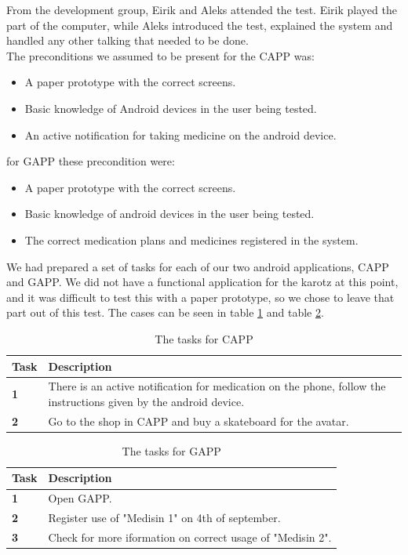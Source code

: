 From the development group, Eirik and Aleks attended the test. Eirik played the part of the computer, while Aleks introduced the test, explained the system and handled
any other talking that needed to be done.\\
The preconditions we assumed to be present for the CAPP was:
\begin{itemize}
	\item A paper prototype with the correct screens.
	\item Basic knowledge of Android devices in the user being tested.
	\item An active notification for taking medicine on the android device.
\end{itemize}
for GAPP these precondition were:
\begin{itemize}
	\item A paper prototype with the correct screens.
	\item Basic knowledge of android devices in the user being tested.
	\item The correct medication plans and medicines registered in the system.
\end{itemize}

We had prepared a set of tasks for each of our two android applications, CAPP and GAPP. We did not have a functional application for the karotz at this point, and it was difficult to
test this with a paper prototype, so we chose to leave that part out of this test. The cases can be seen in table \ref{tab:capptasks} and table \ref{tab:gapptasks}.

\begin{table}[h]
	\begin{center}
		\begin{tabular}{|p{1.0cm}|p{10.0cm}|}
			\hline
			\bf{Task} & \bf{Description}\\
			\hline
			\bf{1} & There is an active notification for medication on the phone, follow the instructions given by the android device.\\
			\bf{2} & Go to the shop in CAPP and buy a skateboard for the avatar.\\
			\hline
		\end{tabular}
	\end{center}
	\caption{The tasks for CAPP}
	\label{tab:capptasks}
\end{table}

\begin{table}[h]
	\begin{center}
		\begin{tabular}{|p{1.0cm}|p{10.0cm}|}
			\hline
			\bf{Task} & \bf{Description}\\
			\hline
			\bf{1} & Open GAPP.\\
			\bf{2} & Register use of "Medisin 1" on 4th of september.\\
			\bf{3} & Check for more iformation on correct usage of "Medisin 2".\\
			\hline
		\end{tabular}
	\end{center}
	\caption{The tasks for GAPP}
	\label{tab:gapptasks}
\end{table}

